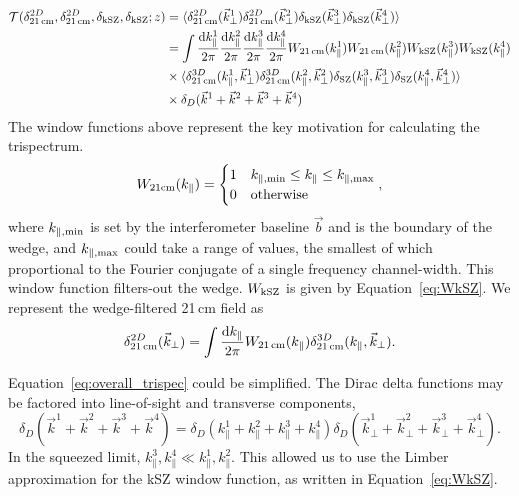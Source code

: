 \begin{equation}
\begin{split}
\mathcal{T}(\delta^{2D}_{\rm 21\,cm}, \delta^{2D}_{\rm 21\,cm}, \delta_{\rm kSZ}, \delta_{\rm kSZ}; z) &=
\langle \delta^{2D}_{\rm 21\,cm}(\vec{k}^1_{\perp})  \delta^{2D}_{\rm 21\,cm}(\vec{k}^2_{\perp})  \delta_{\rm kSZ}(\vec{k}^3_{\perp})\delta_{\rm kSZ}(\vec{k}^4_{\perp}) \rangle \\
&=
\int \frac{{\rm d}k^1_{\parallel}}{2\pi} \frac{{\rm d}k^2_{\parallel}}{2\pi} \frac{{\rm d}k^3_{\parallel}}{2\pi} \frac{{\rm d}k^4_{\parallel}}{2\pi}
W_{\rm 21\,cm}(k^1_{\parallel}) W_{\rm 21\,cm}(k^2_{\parallel}) W_{\rm kSZ}(k^3_{\parallel}) W_{\rm kSZ}(k^4_{\parallel}) \\
&
\times \langle \delta^{3D}_{\rm 21\,cm}(k^1_{\parallel}, \vec{k}^1_{\perp}) \delta^{3D}_{\rm 21\,cm}(k^2_{\parallel}, \vec{k}^2_{\perp}) \delta_{\rm SZ}(k^3_{\parallel}, \vec{k}^3_{\perp})  \delta_{\rm SZ}(k^4_{\parallel}, \vec{k}^4_{\perp}) \rangle \\
&
\times \delta_D(\vec{k}^1 + \vec{k}^2 + \vec{k}^3 + \vec{k}^4)
\end{split}
\label{eq:overall_trispec}
\end{equation}
The window functions above represent the key motivation for calculating the trispectrum.
\begin{equation}
W_{\rm 21cm}(k_{\parallel}) = 
\begin{cases} 
      1 & k_{\parallel, {\rm min}}\leq k_{\parallel} \leq k_{\parallel, {\rm max}} \\
      0 & {\rm otherwise}
\end{cases},
\label{eq:trispec_W21_kpl}
\end{equation}
where $k_{\parallel, {\rm min}}$ is set by the interferometer baseline $\vec{b}$ and is the boundary of the wedge, and $k_{\parallel, {\rm max}}$ could take a range of values, the smallest of which proportional to the Fourier conjugate of a single frequency channel-width. This window function filters-out the wedge. $W_{\rm kSZ}$ is given by Equation~\ref{eq:WkSZ}. We represent the wedge-filtered 21\,cm field as
\begin{equation}
\delta^{2D}_{\rm 21\,cm}(\vec{k}_{\perp}) = \int \frac{{\rm d}k_{\parallel}}{2\pi} W_{\rm 21\,cm}(k_{\parallel}) \delta^{3D}_{\rm 21\,cm}(k_{\parallel}, \vec{k}_{\perp}).
\end{equation}

Equation~\ref{eq:overall_trispec} could be simplified. The Dirac delta functions may be factored into line-of-sight and transverse components,
\begin{equation}
\delta_D(\vec{k}^1 + \vec{k}^2 + \vec{k}^3 + \vec{k}^4) = \delta_D(k^1_{\parallel} + k^2_{\parallel} + k^3_{\parallel} + k^4_{\parallel})\delta_D(\vec{k}^1_{\perp} + \vec{k}^2_{\perp} + \vec{k}^3_{\perp} + \vec{k}^4_{\perp}).
\end{equation}
In the squeezed limit, $k^3_{\parallel},k^4_{\parallel} \ll k^1_{\parallel},k^2_{\parallel}$. This allowed us to use the Limber approximation for the kSZ window function, as written in Equation~\ref{eq:WkSZ}. 

